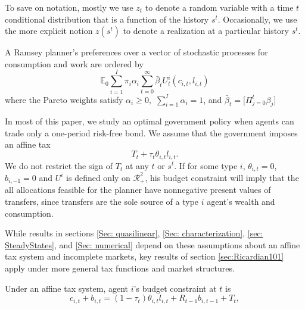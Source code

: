 \documentclass[thmsb,11pt]{article}
\begin{document}
To save on notation, mostly we
use $z_{t}$ to denote a random variable with a time $t$ conditional
distribution that is a function of the history $s^{t}$.
 Occasionally, we use the more explicit notion $z\left(
s^{t}\right) $ to denote a realization  at
a particular history $s^{t}.$


A Ramsey  planner's preferences over a vector of stochastic processes for consumption and
work are ordered by
\begin{equation}
\mathbb{E}_{0}\sum_{i=1}^{I}\pi _{i}\alpha _{i}\sum_{t=0}^{\infty }\bar{\beta}_t U_{t}^{i}\left( c_{i,t},l_{i,t}\right)  \label{govmt objective}
\end{equation}
where the Pareto weights satisfy $\alpha _{i}\geq 0,$ $\sum_{i=1}^{I}\alpha _{i}=1$, and $\bar{\beta}_t=\bigl[\Pi_{j=0}^t \beta_j\bigr]$

In most of this paper, we study an optimal  government policy when agents can   trade
only a one-period risk-free bond.  We assume that the government  imposes an
affine tax
\begin{equation*}
T_t + \tau_t \theta_{i,t}l_{i,t}. \end{equation*}
We do not restrict the sign of $T_{t}$ at any $t$ or $s^t$. %
If for some type $i$, $\theta _{i,t}=0$, $b_{i, -1} = 0$ and $U^i$ is defined only on $\mathcal{R}^2_{+}$, his budget constraint will imply that the all allocations feasible for the planner have nonnegative present values of
transfers, since transfers are the sole source of a type $i$ agent's wealth and consumption.

While results in sections \ref{Sec: quasilinear}, \ref{Sec: characterization}, \ref{sec: SteadyStates}, and  \ref{Sec: numerical}  depend on these  assumptions about an affine tax system and incomplete markets,
  key results of  section  \ref{sec:Ricardian101} apply under  more general tax functions and
market structures.

Under an affine tax system, agent $i$'s budget constraint at $t$ is%
\begin{equation}
c_{i,t}+b_{i,t}=\left( 1-\tau _{t}\right) \theta
_{i,t}l_{i,t}+R_{t-1}b_{i,t-1}+T_{t},  \label{agent bc affine}
\end{equation}
\end{document}
